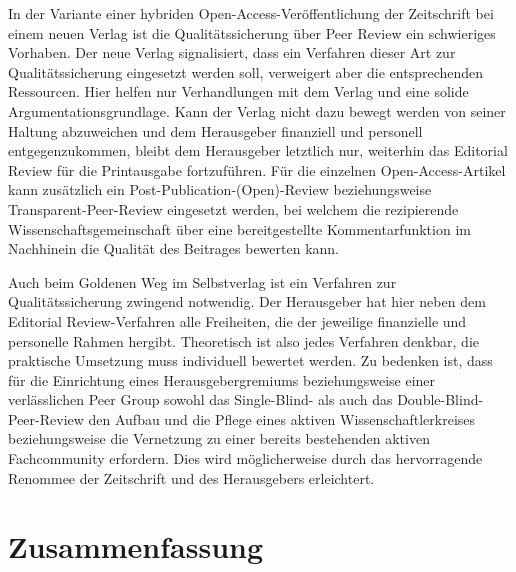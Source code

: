 \documentclass[a4paper,
fontsize=11pt,
oneside,
numbers=noperiodatend,
parskip=half-,
bibliography=totoc,
final
]{scrartcl}
\begin{document}
In der Variante einer hybriden Open-Access-Veröffentlichung der
Zeitschrift bei einem neuen Verlag ist die Qualitätssicherung über Peer
Review ein schwieriges Vorhaben. Der neue Verlag signalisiert, dass ein
Verfahren dieser Art zur Qualitätssicherung eingesetzt werden soll,
verweigert aber die entsprechenden Ressourcen. Hier helfen nur
Verhandlungen mit dem Verlag und eine solide Argumentationsgrundlage.
Kann der Verlag nicht dazu bewegt werden von seiner Haltung abzuweichen
und dem Herausgeber finanziell und personell entgegenzukommen, bleibt
dem Herausgeber letztlich nur, weiterhin das Editorial Review für die
Printausgabe fortzuführen. Für die einzelnen Open-Access-Artikel kann
zusätzlich ein Post-Publication-(Open)-Review beziehungsweise
Transparent-Peer-Review eingesetzt werden, bei welchem die rezipierende
Wissenschaftsgemeinschaft über eine bereitgestellte Kommentarfunktion im
Nachhinein die Qualität des Beitrages bewerten kann.

Auch beim Goldenen Weg im Selbstverlag ist ein Verfahren zur
Qualitätssicherung zwingend notwendig. Der Herausgeber hat hier neben
dem Editorial Review-Verfahren alle Freiheiten, die der jeweilige
finanzielle und personelle Rahmen hergibt. Theoretisch ist also jedes
Verfahren denkbar, die praktische Umsetzung muss individuell bewertet
werden. Zu bedenken ist, dass für die Einrichtung eines
Herausgebergremiums beziehungsweise einer verlässlichen Peer Group
sowohl das Single-Blind- als auch das Double-Blind-Peer-Review den
Aufbau und die Pflege eines aktiven Wissenschaftlerkreises
beziehungsweise die Vernetzung zu einer bereits bestehenden aktiven
Fachcommunity erfordern. Dies wird möglicherweise durch das
hervorragende Renommee der Zeitschrift und des Herausgebers erleichtert.

\section*{Zusammenfassung}\label{zusammenfassung}
\end{document}
